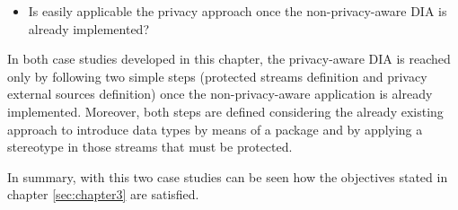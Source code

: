 \begin{itemize}
\item Is easily applicable the privacy approach once the non-privacy-aware DIA is already implemented?
\end{itemize}

In both case studies developed in this chapter, the privacy-aware DIA is reached only by following two simple steps (protected streams definition and privacy external sources definition) once the non-privacy-aware application is already implemented. Moreover, both steps are defined considering the already existing approach to introduce data types by means of a package and by applying a stereotype in those streams that must be protected.

In summary, with this two case studies can be seen how the objectives stated in chapter \ref{sec:chapter3} are satisfied.

